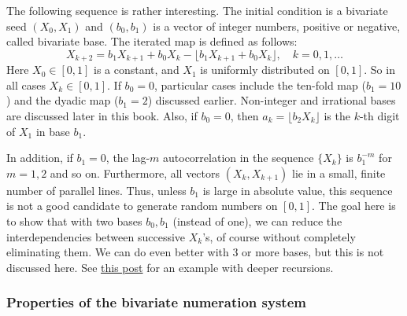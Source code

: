 \documentclass[oneside,10pt]{book}
\begin{document}
The following sequence is rather interesting. The initial condition is a \textcolor{index}{bivariate seed} $(X_0, X_1)$ and $(b_0,b_1)$ is a vector of integer numbers, positive or negative, called \textcolor{index}{bivariate base}. The iterated map is defined as follows:
$$
X_{k+2} = b_1 X_{k+1} + b_0 X_k - \lfloor b_1 X_{k+1} + b_0 X_k \rfloor, \quad k=0,1,\dots
$$
Here $X_0\in [0, 1]$ is a constant, and $X_1$ is uniformly distributed on $[0, 1]$. So in all cases $X_k\in [0, 1]$. If $b_0=0$, particular cases include the ten-fold map ($b_1=10$) and the dyadic map ($b_1=2$) discussed earlier. Non-integer and \textcolor{index}{irrational bases} are discussed later in this book.  Also, if $b_0=0$, then $a_k = \lfloor b_2 X_k\rfloor$ is the $k$-th digit of $X_1$ in base $b_1$. 

In addition, if $b_1=0$, the lag-$m$ autocorrelation
 in the sequence $\{X_k\}$ is $b_1^{-m}$ for $m=1,2$ and so on. Furthermore,
 all vectors $(X_k,X_{k+1})$ lie in a small, finite number of parallel lines. Thus, unless $b_1$ is large in absolute value, this sequence is not a good candidate to generate random numbers on $[0,1]$. The goal here is to show that with two bases $b_0,b_1$ (instead of one), we can reduce the 
 interdependencies between successive $X_k$'s, of course without completely eliminating them. We can do even better with 3 or more bases, but this is not discussed here.  See \href{https://math.stackexchange.com/questions/4308185/period-or-lack-of-for-a-probably-new-pseudo-random-number-generator}{this post} for an example with deeper recursions.

\subsubsection{Properties of the bivariate numeration system}\label{ssda}
\end{document}
